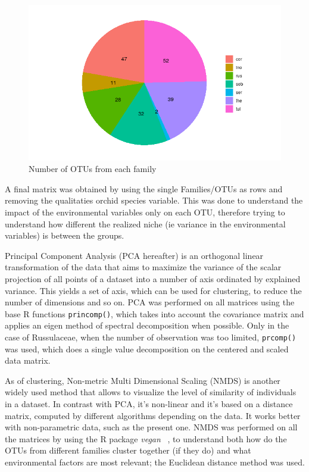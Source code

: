 \begin{figure}[htbp]
\centering
\includegraphics[keepaspectratio,width=\textwidth,height=0.75\textheight]{images/clust.png}
\caption{Number of OTUs from each family}
\end{figure}

A final matrix was obtained by using the single Families\slash OTUs as rows and removing the qualitaties orchid species variable. This was done to understand the impact of the environmental variables only on each OTU, therefore trying to understand how different the realized niche (ie variance in the environmental variables) is between the groups.

Principal Component Analysis (PCA hereafter) is an orthogonal linear transformation of the data that aims to maximize the variance of the scalar projection of all points of a dataset into a number of axis ordinated by explained variance. This yields a set of axis, which can be used for clustering, to reduce the number of dimensions and so on. PCA was performed on all matrices using the base R functions \texttt{princomp()}, which takes into account the covariance matrix and applies an eigen method of spectral decomposition when possible. Only in the case of Russulaceae, when the number of observation was too limited, \texttt{prcomp()} was used, which does a single value decomposition on the centered and scaled data matrix.

As of clustering, Non-metric Multi Dimensional Scaling (NMDS) is another widely used method that allows to visualize the level of similarity of individuals in a dataset. In contrast with PCA, it's non-linear and it's based on a distance matrix, computed by different algorithms depending on the data. It works better with non-parametric data, such as the present one. NMDS was performed on all the matrices by using the R package \emph{vegan} ~\citep{dixon2003a}, to understand both how do the OTUs from different families cluster together (if they do) and what environmental factors are most relevant; the Euclidean distance method was used.

